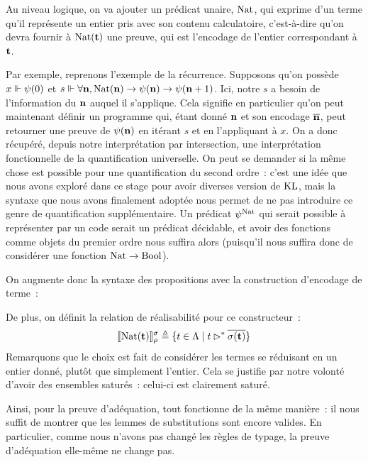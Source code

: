 \documentclass{article}
\begin{document}
Au niveau logique, on va ajouter un prédicat unaire, $\Nat$, qui exprime d'un terme qu'il représente un entier pris avec son contenu calculatoire, c'est-à-dire qu'on devra fournir à $\Nat(\bt)$ une preuve, qui est l'encodage de l'entier correspondant à $\bt$.

Par exemple, reprenons l'exemple de la récurrence. Supposons qu'on possède $x\reali \psi(0)$ et $s\reali \forall \bn, \Nat(\bn) \to \psi(\bn) \to \psi(\bn+1)$. Ici, notre $s$ a besoin de l'information du $\bn$ auquel il s'applique. Cela signifie en particulier qu'on peut maintenant définir un programme qui, étant donné $\bn$ et son encodage $\overline{\bn}$, peut retourner une preuve de $\psi(\bn)$ en itérant $s$ et en l'appliquant à $x$. On a donc récupéré, depuis notre interprétation par intersection, une interprétation fonctionnelle de la quantification universelle. On peut se demander si la même chose est possible pour une quantification du second ordre~: c'est une idée que nous avons exploré dans ce stage pour avoir diverses version de $\KL$, mais la syntaxe que nous avons finalement adoptée nous permet de ne pas introduire ce genre de quantification supplémentaire. Un prédicat $\psi^{\Nat}$ qui serait possible à représenter par un code serait un prédicat décidable, et avoir des fonctions comme objets du premier ordre nous suffira alors (puisqu'il nous suffira donc de considérer une fonction $\Nat\to\Bool$).

On augmente donc la syntaxe des propositions avec la construction d'encodage de terme~:
\begin{center}
    \begin{prooftree}
    \end{prooftree}
\end{center}

De plus, on définit la relation de réalisabilité pour ce constructeur~:
\[\trad{\Nat(\bt)}_\rho^\sigma \defeq \{t\in \Lambda\mid t \rhd^* \overline{\sigma(\bt)}\}\]
Remarquons que le choix est fait de considérer les termes se réduisant en un entier donné, plutôt que simplement l'entier. Cela se justifie par notre volonté d'avoir des ensembles saturés~: celui-ci est clairement saturé.

Ainsi, pour la preuve d'adéquation, tout fonctionne de la même manière~: il nous suffit de montrer que les lemmes de substitutions sont encore valides. En particulier, comme nous n'avons pas changé les règles de typage, la preuve d'adéquation elle-même ne change pas.
\end{document}
